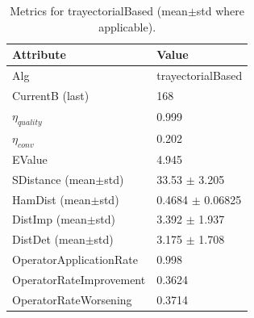 \begin{table}[t]
\centering
\small
\begin{tabular}{ll}
\toprule
Attribute & Value \\
\midrule
Alg & trayectorialBased \\
CurrentB (last) & 168 \\
$\eta_{quality}$ & 0.999 \\
$\eta_{conv}$ & 0.202 \\
EValue & 4.945 \\
SDistance (mean$\pm$std) & 33.53 $\pm$ 3.205 \\
HamDist (mean$\pm$std) & 0.4684 $\pm$ 0.06825 \\
DistImp (mean$\pm$std) & 3.392 $\pm$ 1.937 \\
DistDet (mean$\pm$std) & 3.175 $\pm$ 1.708 \\
OperatorApplicationRate & 0.998 \\
OperatorRateImprovement & 0.3624 \\
OperatorRateWorsening & 0.3714 \\
\bottomrule
\end{tabular}
\caption{Metrics for trayectorialBased (mean$\pm$std where applicable).}
\label{tab:metrics}
\end{table}
